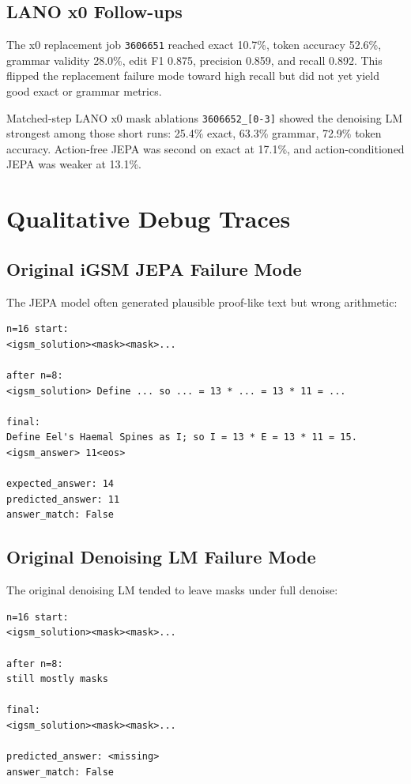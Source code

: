 \documentclass[11pt]{article}
\begin{document}
\subsection{LANO x0 Follow-ups}

The x0 replacement job \texttt{3606651} reached exact 10.7\%, token accuracy
52.6\%, grammar validity 28.0\%, edit F1 0.875, precision 0.859, and recall
0.892.  This flipped the replacement failure mode toward high recall but did not
yet yield good exact or grammar metrics.

Matched-step LANO x0 mask ablations \texttt{3606652\_[0-3]} showed the
denoising LM strongest among those short runs: 25.4\% exact, 63.3\% grammar,
72.9\% token accuracy.  Action-free JEPA was second on exact at 17.1\%, and
action-conditioned JEPA was weaker at 13.1\%.

\section{Qualitative Debug Traces}

\subsection{Original iGSM JEPA Failure Mode}

The JEPA model often generated plausible proof-like text but wrong arithmetic:
\begin{lstlisting}
n=16 start:
<igsm_solution><mask><mask>...

after n=8:
<igsm_solution> Define ... so ... = 13 * ... = 13 * 11 = ...

final:
Define Eel's Haemal Spines as I; so I = 13 * E = 13 * 11 = 15.
<igsm_answer> 11<eos>

expected_answer: 14
predicted_answer: 11
answer_match: False
\end{lstlisting}

\subsection{Original Denoising LM Failure Mode}

The original denoising LM tended to leave masks under full denoise:
\begin{lstlisting}
n=16 start:
<igsm_solution><mask><mask>...

after n=8:
still mostly masks

final:
<igsm_solution><mask><mask>...

predicted_answer: <missing>
answer_match: False
\end{lstlisting}
\end{document}
